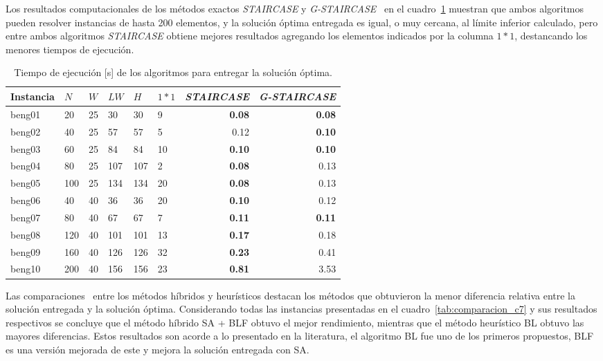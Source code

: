 \documentclass[letter, 10pt]{article}
\begin{document}
Los resultados computacionales de los m\'etodos exactos \emph{STAIRCASE} y \emph{G-STAIRCASE}~\cite{kenmochi2009exact} en el cuadro~\ref{tab:comparacion_beng10} muestran que ambos algoritmos pueden resolver instancias de hasta 200 elementos, y la soluci\'on \'optima entregada es igual, o muy cercana, al l\'imite inferior calculado, pero entre ambos algoritmos \emph{STAIRCASE} obtiene mejores resultados agregando los elementos indicados por la columna $1*1$, destancando los menores tiempos de ejecuci\'on.

\renewcommand{\arraystretch}{1.1}
\begin{table}[H]
    \centering
    \begin{tabular}{|l|lllll|rr|}
    \hline
    Instancia & \multicolumn{1}{l}{$N$} & \multicolumn{1}{l}{$W$} & \multicolumn{1}{l}{$LW$} & \multicolumn{1}{l}{$H$} & \multicolumn{1}{l|}{$1*1$} & \multicolumn{1}{l}{\emph{STAIRCASE}} & \multicolumn{1}{l|}{\emph{G-STAIRCASE}} \\ \hline
    beng01 & 20 & 25 & 30 & 30 & 9 & \textbf{0.08} & \textbf{0.08} \\ \hline
    beng02 & 40 & 25 & 57 & 57 & 5 & 0.12 & \textbf{0.10} \\ \hline
    beng03 & 60 & 25 & 84 & 84 & 10 & \textbf{0.10} & \textbf{0.10} \\ \hline
    beng04 & 80 & 25 & 107 & 107 & 2 & \textbf{0.08} & 0.13 \\ \hline
    beng05 & 100 & 25 & 134 & 134 & 20 & \textbf{0.08} & 0.13 \\ \hline
    beng06 & 40 & 40 & 36 & 36 & 20 & \textbf{0.10} & 0.12 \\ \hline
    beng07 & 80 & 40 & 67 & 67 & 7 & \textbf{0.11} & \textbf{0.11} \\ \hline
    beng08 & 120 & 40 & 101 & 101 & 13 & \textbf{0.17} & 0.18 \\ \hline
    beng09 & 160 & 40 & 126 & 126 & 32 & \textbf{0.23} & 0.41 \\ \hline
    beng10 & 200 & 40 & 156 & 156 & 23 & \textbf{0.81} & 3.53 \\ \hline
    \end{tabular}
    \caption{Tiempo de ejecuci\'on [s] de los algoritmos para entregar la soluci\'on \'optima.}
    \label{tab:comparacion_beng10}
\end{table}

Las comparaciones~\cite{hopper2001empirical} entre los m\'etodos h\'ibridos y heur\'isticos destacan los m\'etodos que obtuvieron la menor diferencia relativa entre la soluci\'on entregada y la soluci\'on \'optima. Considerando todas las instancias presentadas en el cuadro~\ref{tab:comparacion_c7} y sus resultados respectivos se concluye que el m\'etodo h\'ibrido SA + BLF obtuvo el mejor rendimiento, mientras que el m\'etodo heur\'istico BL obtuvo las mayores diferencias. Estos resultados son acorde a lo presentado en la literatura, el algoritmo BL fue uno de los primeros propuestos, BLF es una versi\'on mejorada de este y mejora la soluci\'on entregada con SA.
\end{document}
